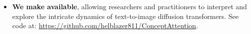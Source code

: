 \begin{itemize}
    \item \textbf{We make \tool{} available}, allowing researchers and practitioners to interpret and explore the intricate dynamics of text-to-image diffusion transformers. See code at: \href{https://github.com/helblazer811/ConceptAttention}{https://github.com/helblazer811/ConceptAttention}.
\end{itemize}




